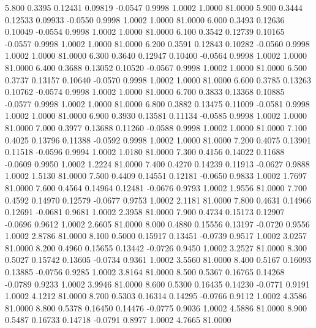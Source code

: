    5.800   0.3395   0.12431   0.09819  -0.0547   0.9998   1.0002   1.0000  81.0000
   5.900   0.3444   0.12533   0.09933  -0.0550   0.9998   1.0002   1.0000  81.0000
   6.000   0.3493   0.12636   0.10049  -0.0554   0.9998   1.0002   1.0000  81.0000
   6.100   0.3542   0.12739   0.10165  -0.0557   0.9998   1.0002   1.0000  81.0000
   6.200   0.3591   0.12843   0.10282  -0.0560   0.9998   1.0002   1.0000  81.0000
   6.300   0.3640   0.12947   0.10400  -0.0564   0.9998   1.0002   1.0000  81.0000
   6.400   0.3688   0.13052   0.10520  -0.0567   0.9998   1.0002   1.0000  81.0000
   6.500   0.3737   0.13157   0.10640  -0.0570   0.9998   1.0002   1.0000  81.0000
   6.600   0.3785   0.13263   0.10762  -0.0574   0.9998   1.0002   1.0000  81.0000
   6.700   0.3833   0.13368   0.10885  -0.0577   0.9998   1.0002   1.0000  81.0000
   6.800   0.3882   0.13475   0.11009  -0.0581   0.9998   1.0002   1.0000  81.0000
   6.900   0.3930   0.13581   0.11134  -0.0585   0.9998   1.0002   1.0000  81.0000
   7.000   0.3977   0.13688   0.11260  -0.0588   0.9998   1.0002   1.0000  81.0000
   7.100   0.4025   0.13796   0.11388  -0.0592   0.9998   1.0002   1.0000  81.0000
   7.200   0.4075   0.13901   0.11518  -0.0596   0.9994   1.0002   1.0180  81.0000
   7.300   0.4156   0.14022   0.11688  -0.0609   0.9950   1.0002   1.2224  81.0000
   7.400   0.4270   0.14239   0.11913  -0.0627   0.9888   1.0002   1.5130  81.0000
   7.500   0.4409   0.14551   0.12181  -0.0650   0.9833   1.0002   1.7697  81.0000
   7.600   0.4564   0.14964   0.12481  -0.0676   0.9793   1.0002   1.9556  81.0000
   7.700   0.4592   0.14970   0.12579  -0.0677   0.9753   1.0002   2.1181  81.0000
   7.800   0.4631   0.14966   0.12691  -0.0681   0.9681   1.0002   2.3958  81.0000
   7.900   0.4734   0.15173   0.12907  -0.0696   0.9612   1.0002   2.6605  81.0000
   8.000   0.4880   0.15556   0.13197  -0.0720   0.9556   1.0002   2.8786  81.0000
   8.100   0.5000   0.15917   0.13451  -0.0739   0.9517   1.0002   3.0257  81.0000
   8.200   0.4960   0.15655   0.13442  -0.0726   0.9450   1.0002   3.2527  81.0000
   8.300   0.5027   0.15742   0.13605  -0.0734   0.9361   1.0002   3.5560  81.0000
   8.400   0.5167   0.16093   0.13885  -0.0756   0.9285   1.0002   3.8164  81.0000
   8.500   0.5367   0.16765   0.14268  -0.0789   0.9233   1.0002   3.9946  81.0000
   8.600   0.5300   0.16435   0.14230  -0.0771   0.9191   1.0002   4.1212  81.0000
   8.700   0.5303   0.16314   0.14295  -0.0766   0.9112   1.0002   4.3586  81.0000
   8.800   0.5378   0.16450   0.14476  -0.0775   0.9036   1.0002   4.5886  81.0000
   8.900   0.5487   0.16733   0.14718  -0.0791   0.8977   1.0002   4.7665  81.0000
